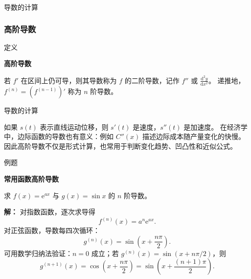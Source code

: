 \documentclass[aspectratio=169,10pt,fontset=fandol]{ctexbeamer}
\newcommand{\dd}{\mathrm{d}}
\newcommand{\ee}{\mathrm{e}}
\begin{document}
\begin{frame}[t,fragile]{导数的计算}
\normalsize
{\normalsize

\subsubsection*{高阶导数}


}
\begin{block}{定义}
{\normalsize
\textbf{高阶导数}\par

若 $f'$ 在区间上仍可导，则其导数称为 $f$ 的二阶导数，记作 $f''$ 或 $\frac{\dd^2y}{\dd x^2}$。 递推地，$f^{(n)}=(f^{(n-1)})'$ 称为 $n$ 阶导数。

}
\end{block}
\end{frame}
\begin{frame}[t,fragile]{导数的计算}
\small
{\small
如果 $s(t)$ 表示直线运动位移，则 $s'(t)$ 是速度，$s''(t)$ 是加速度。 在经济学中，边际函数的导数也有意义：例如 $C''(x)$ 描述边际成本随产量变化的快慢。 因此高阶导数不仅是形式计算，也常用于判断变化趋势、凹凸性和近似公式。


}
\begin{block}{例题}
{\small
\textbf{常用函数高阶导数}\par

求 $f(x)=\ee^{ax}$ 与 $g(x)=\sin x$ 的 $n$ 阶导数。

}
\end{block}
\pause
{\small
\textbf{解：}
对指数函数，逐次求导得
\[
f^{(n)}(x)=a^n\ee^{ax}.
\]
对正弦函数，导数每四次循环：
\[
g^{(n)}(x)=\sin\left(x+\frac{n\pi}{2}\right).
\]
可用数学归纳法验证：$n=0$ 成立；若 $g^{(n)}(x)=\sin(x+n\pi/2)$，则
\[
g^{(n+1)}(x)=\cos\left(x+\frac{n\pi}{2}\right)=\sin\left(x+\frac{(n+1)\pi}{2}\right).
\]

}
\end{frame}
\end{document}
